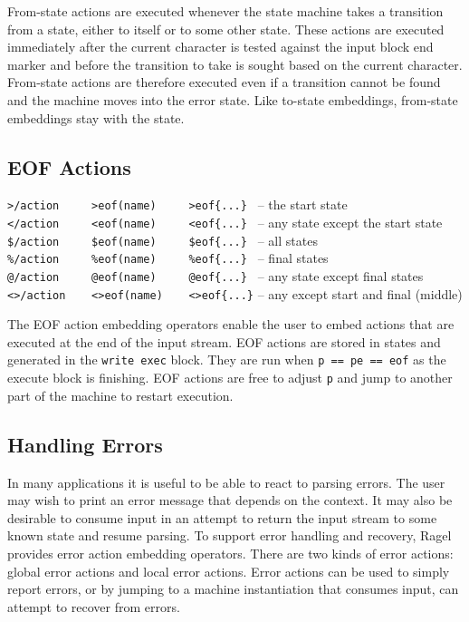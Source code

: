 \documentclass[letterpaper,11pt,oneside]{book}
\begin{document}
From-state actions are executed whenever the state machine takes a transition from a
state, either to itself or to some other state. These actions are executed
immediately after the current character is tested against the input block end
marker and before the transition to take is sought based on the current
character. From-state actions are therefore executed even if a transition
cannot be found and the machine moves into the error state.  Like to-state
embeddings, from-state embeddings stay with the state.

\subsection{EOF Actions}

\hspace*{24pt}\verb|>/action     >eof(name)     >eof{...} | -- the start state\\
\hspace*{24pt}\verb|</action     <eof(name)     <eof{...} | -- any state except the start state\\
\hspace*{24pt}\verb|$/action     $eof(name)     $eof{...} | -- all states\\
\hspace*{24pt}\verb|%/action     %eof(name)     %eof{...} | -- final states\\
\hspace*{24pt}\verb|@/action     @eof(name)     @eof{...} | -- any state except final states\\
\hspace*{24pt}\verb|<>/action    <>eof(name)    <>eof{...}| -- any except start and final (middle)
\vspace{12pt}

The EOF action embedding operators enable the user to embed actions that are
executed at the end of the input stream. EOF actions are stored in states and
generated in the \verb|write exec| block. They are run when \verb|p == pe == eof|
as the execute block is finishing. EOF actions are free to adjust \verb|p| and
jump to another part of the machine to restart execution.

\subsection{Handling Errors}

In many applications it is useful to be able to react to parsing errors.  The
user may wish to print an error message that depends on the context.  It
may also be desirable to consume input in an attempt to return the input stream
to some known state and resume parsing. To support error handling and recovery,
Ragel provides error action embedding operators. There are two kinds of error
actions: global error actions and local error actions.
Error actions can be used to simply report errors, or by jumping to a machine
instantiation that consumes input, can attempt to recover from errors.  
\end{document}
